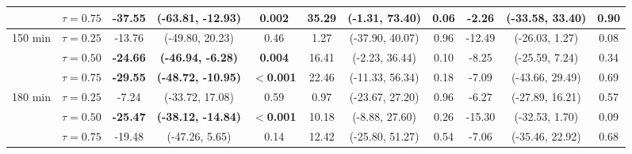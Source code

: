 \begin{table}[ht]
{\begin{tabular}{llccccccccc}
 & $\tau=0.75$ & \textbf{-37.55} & \textbf{(-63.81, -12.93)} & \textbf{0.002} & 35.29 & (-1.31, 73.40) & 0.06 & -2.26 & (-33.58, 33.40) & 0.90 \\
\midrule
\multirow{3}{*}{150 min} & $\tau=0.25$ & -13.76 & (-49.80, 20.23) & 0.46 & 1.27 & (-37.90, 40.07) & 0.96 & -12.49 & (-26.03, 1.27) & 0.08 \\
 & $\tau=0.50$ & \textbf{-24.66} & \textbf{(-46.94, -6.28)} & \textbf{0.004} & 16.41 & (-2.23, 36.44) & 0.10 & -8.25 & (-25.59, 7.24) & 0.34 \\
 & $\tau=0.75$ & \textbf{-29.55} & \textbf{(-48.72, -10.95)} & \textbf{$<$0.001} & 22.46 & (-11.33, 56.34) & 0.18 & -7.09 & (-43.66, 29.49) & 0.69 \\
\midrule
\multirow{3}{*}{180 min} & $\tau=0.25$ & -7.24 & (-33.72, 17.08) & 0.59 & 0.97 & (-23.67, 27.20) & 0.96 & -6.27 & (-27.89, 16.21) & 0.57 \\
 & $\tau=0.50$ & \textbf{-25.47} & \textbf{(-38.12, -14.84)} & \textbf{$<$0.001} & 10.18 & (-8.88, 27.60) & 0.26 & -15.30 & (-32.53, 1.70) & 0.09 \\
 & $\tau=0.75$ & -19.48 & (-47.26, 5.65) & 0.14 & 12.42 & (-25.80, 51.27) & 0.54 & -7.06 & (-35.46, 22.92) & 0.68 \\
\bottomrule
\end{tabular}%
}
\end{table}
